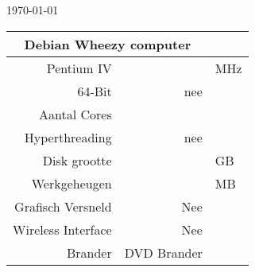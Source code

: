 \documentclass[a4paper,14pt]{extarticle}
\begin{document}
\centerline{\today}
\vskip 0.5cm
\begin{center}
\begin{tabular}{ |r| r| l| }
	\multicolumn{2}{c}{\Huge{Debian Wheezy computer}}\\
	\hline
	Pentium IV & \cpuspeed{} & MHz \\
	64-Bit & nee & \\
	Aantal Cores & \corecount{} & \\
	Hyperthreading & nee & \\
	Disk grootte & \disksize{} & GB \\
	Werkgeheugen & \memsize{} & MB \\
	Grafisch Versneld & Nee & \\
	Wireless Interface & Nee & \\
	Brander & DVD Brander & \\
\end{tabular}
\end{center}
\end{document}
